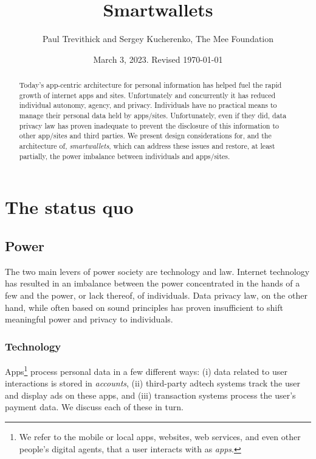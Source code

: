 \documentclass[11pt, oneside]{article}   	%
\title{Smartwallets}
\author{Paul Trevithick and Sergey Kucherenko, The Mee Foundation}
\date{March 3, 2023. Revised \today}
\begin{document}
\maketitle
\begin{abstract}
Today's app-centric architecture for personal information has helped fuel the rapid growth of internet apps and sites. Unfortunately and concurrently it has reduced individual autonomy, agency, and privacy. Individuals have no practical means to manage their personal data held by apps/sites. Unfortunately, even if they did, data privacy law has proven inadequate to prevent the disclosure of this information to other app/sites and third parties. We present design considerations for, and the architecture of, \emph{smartwallets}, which can address these issues and restore, at least partially, the power imbalance between individuals and apps/sites.
\end{abstract}


\section{The status quo} %

\subsection{Power}

The two main levers of power society are technology and law. Internet technology has resulted in an imbalance between the power concentrated in the hands of a few and the power, or lack thereof, of individuals. Data privacy law, on the other hand, while often based on sound principles has proven insufficient to shift meaningful power and privacy to individuals.

\subsubsection{Technology}

Apps\footnote{We refer to the mobile or local apps, websites, web services, and even other people's digital agents, that a user interacts with as \emph{apps}.} process personal data in a few different ways: (i) data related to user interactions is stored in \emph{accounts}, (ii) third-party adtech systems track the user and display ads on these apps, and (iii) transaction systems process the user's payment data. We discuss each of these in turn.
\end{document}

